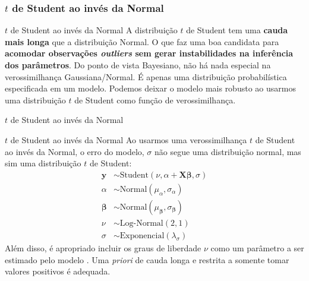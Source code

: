 \subsubsection{$t$ de Student ao invés da Normal}
\begin{frame}{$t$ de Student ao invés da Normal}
	A distribuição $t$ de Student tem uma \textbf{cauda mais longa} que a
	distribuição Normal.
	\vfill
	O que faz uma boa candidata para \textbf{acomodar observações \textit{outliers} sem
		gerar instabilidades na inferência dos parâmetros}.
	\vfill
	Do ponto de vista Bayesiano, não há nada especial na verossimilhança
	Gaussiana/Normal. É apenas uma distribuição probabilística especificada
	em um modelo. Podemos deixar o modelo mais robusto ao usarmos uma distribuição $t$
	de Student como função de verossimilhança.
\end{frame}

\begin{frame}{$t$ de Student ao invés da Normal}
	\centering
\end{frame}

\begin{frame}{$t$ de Student ao invés da Normal}
	Ao usarmos uma verossimilhança $t$ de Student ao invés da Normal, o erro do modelo,
	$\sigma$ não segue uma distribuição normal, mas sim uma distribuição $t$ de Student:
	$$
		\begin{aligned}
			\boldsymbol{y}     & \sim \text{Student}\left( \nu, \alpha + \mathbf{X} \boldsymbol{\beta}, \sigma \right) \\
			\alpha             & \sim \text{Normal}(\mu_\alpha, \sigma_\alpha)                                         \\
			\boldsymbol{\beta} & \sim \text{Normal}(\mu_{\boldsymbol{\beta}}, \sigma_{\boldsymbol{\beta}})             \\
			\nu                & \sim \text{Log-Normal}(2, 1)                                                          \\
			\sigma             & \sim \text{Exponencial}(\lambda_\sigma)
		\end{aligned}
	$$
	\small
	Além disso, é apropriado incluir os graus de liberdade $\nu$ como um parâmetro a
	ser estimado pelo modelo \parencite{gelman2013bayesian}. Uma \textit{priori}
	de cauda longa e restrita a somente tomar valores positivos é adequada.
\end{frame}

